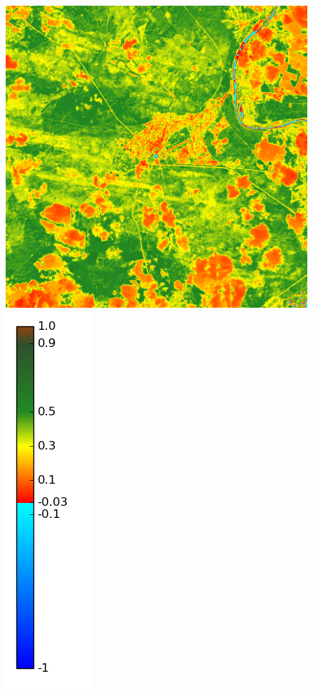 \documentclass{book}
\begin{document}
\begin{figure}[H]
{\includegraphics[scale=0.25]{images/Fontainebleau/08_ndvi.png}
\includegraphics[scale=0.2]{images/colormap.png}
}
\end{figure}
\end{document}
